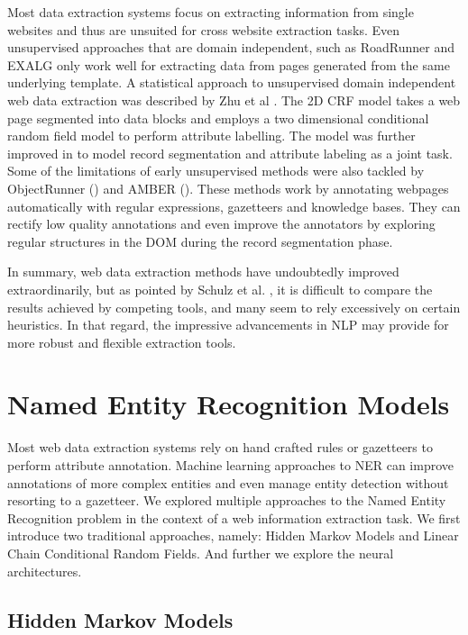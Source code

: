 \documentclass[sigconf]{acmart}
\begin{document}
Most data extraction systems focus on extracting information from single websites
and thus are unsuited for cross website extraction tasks. Even unsupervised
approaches that are domain independent, such as RoadRunner \cite{Crescenzi2001} 
and EXALG \cite{Arasu2003} only work well for extracting data from pages generated 
from the same underlying template. A statistical approach to unsupervised domain 
independent web data extraction was described by Zhu et al \cite{Zhu2005}. The 2D CRF 
model takes a web page segmented into data blocks and employs a two dimensional conditional 
random field model to perform attribute labelling. The model was further improved in 
\cite{Zhu2006} to model record segmentation and attribute labeling as a joint task.
Some of the limitations of early unsupervised methods 
were also tackled by ObjectRunner (\cite{Abdessalem2010}) and AMBER (\cite{Furche2012}). 
These methods work by annotating webpages automatically with regular expressions, gazetteers and 
knowledge bases. They can rectify low quality annotations and even improve the annotators
by exploring regular structures in the DOM during the record segmentation phase.

In summary, web data extraction methods have undoubtedly improved extraordinarily, but
as pointed by Schulz et al. \cite{Schulz2016}, it is difficult to compare the results 
achieved by competing tools, and many seem to rely excessively on certain heuristics.
In that regard, the impressive advancements in NLP may provide for more robust and
flexible extraction tools.

\section{Named Entity Recognition Models}

Most web data extraction systems rely on hand crafted rules or gazetteers to perform
attribute annotation. Machine learning approaches to NER can improve annotations of 
more complex entities and even manage entity detection without resorting to a gazetteer.
We explored multiple approaches to the Named Entity Recognition problem in the context 
of a web information extraction task. We first introduce two traditional approaches, 
namely: Hidden Markov Models and Linear Chain Conditional Random Fields. And further
we explore the neural architectures.

\subsection{Hidden Markov Models}
\end{document}
